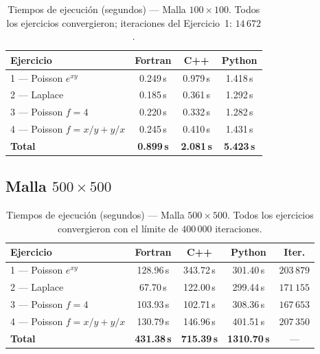 \documentclass[12pt, a4paper]{article}
\begin{document}
\begin{table}[H]
  \centering
  \caption{Tiempos de ejecución (segundos) — Malla $100\times100$.
           Todos los ejercicios convergieron; iteraciones del Ejercicio~1: $14\,672$.}
  \label{tab:bench100}
  \begin{tabular}{lccc}
    \toprule
    \textbf{Ejercicio} & \textbf{Fortran} & \textbf{C++} & \textbf{Python} \\
    \midrule
    1 — Poisson $e^{xy}$       & 0.249\,s & 0.979\,s & 1.418\,s \\
    2 — Laplace                & 0.185\,s & 0.361\,s & 1.292\,s \\
    3 — Poisson $f=4$          & 0.220\,s & 0.332\,s & 1.282\,s \\
    4 — Poisson $f=x/y+y/x$   & 0.245\,s & 0.410\,s & 1.431\,s \\
    \midrule
    \textbf{Total}             & \textbf{0.899\,s} & \textbf{2.081\,s} & \textbf{5.423\,s} \\
    \bottomrule
  \end{tabular}
\end{table}

\subsection{Malla $500\times500$}

\begin{table}[H]
  \centering
  \caption{Tiempos de ejecución (segundos) — Malla $500\times500$.
           Todos los ejercicios convergieron con el límite de $400\,000$ iteraciones.}
  \label{tab:bench500}
  \begin{tabular}{lcccc}
    \toprule
    \textbf{Ejercicio} & \textbf{Fortran} & \textbf{C++} & \textbf{Python} & \textbf{Iter.} \\
    \midrule
    1 — Poisson $e^{xy}$     & 128.96\,s & 343.72\,s & 301.40\,s & $203\,879$ \\
    2 — Laplace              &  67.70\,s & 122.00\,s & 299.44\,s & $171\,155$ \\
    3 — Poisson $f=4$        & 103.93\,s & 102.71\,s & 308.36\,s & $167\,653$ \\
    4 — Poisson $f=x/y+y/x$ & 130.79\,s & 146.96\,s & 401.51\,s & $207\,350$ \\
    \midrule
    \textbf{Total}           & \textbf{431.38\,s} & \textbf{715.39\,s} & \textbf{1310.70\,s} & — \\
    \bottomrule
  \end{tabular}
\end{table}
\end{document}
